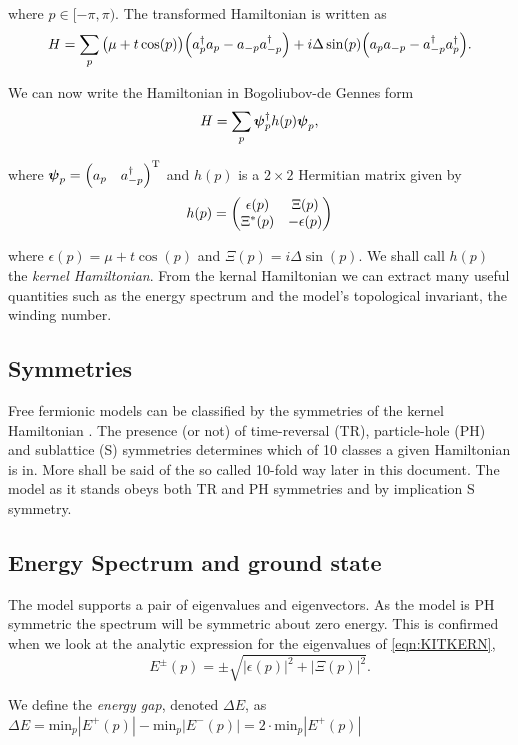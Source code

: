 \noi where $p\in[-\pi,\pi)$. The transformed Hamiltonian is written as
\begin{equation}
    H = \sum_{p} \big(\mu + t\cos(p)\big)\Big(a_{p}^{\dagger}a_{p} -a_{-p}a_{-p}^{\dagger}\Big) + i\Delta\sin(p)\Big(a_{p}a_{-p} - a_{-p}^{\dagger}a_{p}^{\dagger}\Big).
\end{equation}

We can now write the Hamiltonian in Bogoliubov-de Gennes form 
\begin{equation}
    H = \sum_{p}\boldsymbol{\psi}_{p}^{\dagger}h(p)\boldsymbol{\psi}_{p},
\end{equation}

\noi where $\boldsymbol{\psi}_{p}=\begin{pmatrix} a_{p} & a_{-p}^{\dagger}  \end{pmatrix} ^{\text{T}}$ and $h(p)$ is a $2\times2$ Hermitian matrix given by
\begin{equation}\label{eqn:KITKERN}
    h(p) = \begin{pmatrix} \epsilon(p) & \Xi(p) \\ \Xi^{*}(p) & -\epsilon(p) \end{pmatrix}
\end{equation}

\noi where $\epsilon(p)=\mu+t\cos(p)$ and $\Xi(p)=i\Delta\sin(p)$. We shall call $h(p)$ the \emph{kernel Hamiltonian}. From the kernal Hamiltonian we can extract many useful quantities such as the energy spectrum and the model's topological invariant, the winding number.

\subsection{Symmetries}

Free fermionic models can be classified by the symmetries of the kernel Hamiltonian \cite{Ryu10,Wen12,Schnyder08}. The presence (or not) of time-reversal (TR), particle-hole (PH) and sublattice (S) symmetries determines which of 10 classes a given Hamiltonian is in. More shall be said of the so called 10-fold way later in this document. The model as it stands obeys both TR and PH symmetries and by implication S symmetry.  

\subsection{Energy Spectrum and ground state}

The model supports a pair of eigenvalues and eigenvectors. As the model is PH symmetric the spectrum will be symmetric about zero energy. This is confirmed when we look at the analytic expression for the eigenvalues of \eqref{eqn:KITKERN}, 
\begin{equation}
    E^{\pm}(p)=\pm\sqrt{|\epsilon(p)|^{2} + |\Xi(p)|^{2}}.
\end{equation}

\noi We define the \emph{energy gap}, denoted $\Delta E$, as $\Delta E=\text{min}_{p}|E^{+}(p)|-\text{min}_{p}|E^{-}(p)|=2\cdot\text{min}_{p}|E^{+}(p)|$
